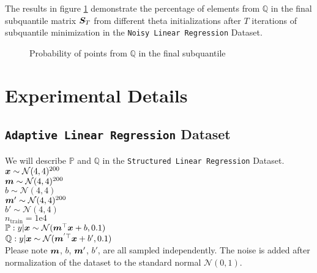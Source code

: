 \documentclass{article} %
\begin{document}
\begin{appendices}
		The results in figure \ref{fig:structure-subquantile} demonstrate the percentage of elements from $\mathbb{Q}$ in the final subquantile matrix ${\bm{S}}_T$ from different theta initializations after $T$ iterations of subquantile minimization in the \texttt{Noisy Linear Regression} Dataset. 
	
	\begin{figure}
		\begin{center}
			
		\end{center}
		\caption{Probability of points from $\mathbb{Q}$ in the final subquantile}
		\label{fig:structure-subquantile}
	\end{figure}
	
	\newpage
	\section{Experimental Details}\label{app:experimental-details}
	
	\subsection{\texttt{Adaptive Linear Regression} Dataset}
	We will describe $\mathbb{P}$ and $\mathbb{Q}$ in the \texttt{Structured Linear Regression} Dataset.\\
	${\bm{x}} \sim \mathcal{N}(4,4)^{200}$\\
	${\bm{m}} \sim \mathcal{N}(4,4)^{200}$\\
	$b \sim \mathcal{N}(4,4)$\\
	${\bm{m}}' \sim \mathcal{N}(4,4)^{200}$\\
	$b' \sim \mathcal{N}(4,4)$\\
	$n_{\text{train}} = 1\text{e}4$\\
	$\mathbb{P}: y|{\bm{x}} \sim \mathcal{N}({\bm{m}}^\top{\bm{x}} + b, 0.1)$\\
	$\mathbb{Q}: y|{\bm{x}} \sim \mathcal{N}({\bm{m}}^{'\top}{\bm{x}} + b', 0.1)$\\
	Please note ${\bm{m}}$, $b$, ${\bm{m}}'$, $b'$, are all sampled independently. The noise is added after normalization of the dataset to the standard normal $\mathcal{N}(0,1)$. 
	

\end{appendices}
\end{document}

